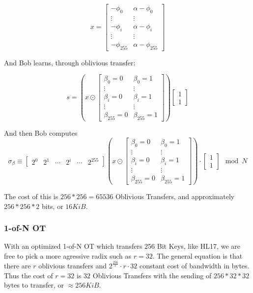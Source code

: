 \documentclass{article}
\begin{document}
$$x =\begin{bmatrix}
-\phi_0 & \alpha - \phi_0 \\
\vdots & \vdots \\
-\phi_i & \alpha - \phi_i \\
\vdots & \vdots \\
-\phi_{255} & \alpha - \phi_{255}
\end{bmatrix}$$

And Bob learns, through oblivious transfer:

$$s = 
\left(x \odot \begin{bmatrix}
\beta_0 = 0 & \beta_0 = 1 \\
\vdots & \vdots \\
\beta_i = 0 & \beta_i = 1 \\
\vdots & \vdots \\
\beta_{255} = 0 & \beta_{255} = 1
\end{bmatrix}\right)
\begin{bmatrix}
1 \\ 1
\end{bmatrix}
$$

And then Bob computes
$$\sigma_{\beta} \equiv 
\begin{bmatrix}
2^0 & 2^1 &\cdots& 2^i & \cdots& 2^{255}
\end{bmatrix}
\left(x \odot \begin{bmatrix}
\beta_0 = 0 & \beta_0 = 1 \\
\vdots & \vdots \\
\beta_i = 0 & \beta_i = 1 \\
\vdots & \vdots \\
\beta_{255} = 0 & \beta_{255} = 1
\end{bmatrix}\right) \cdot \begin{bmatrix}
1\\ 1
\end{bmatrix} \mod N$$



The cost of this is $256*256 = 65536$ Oblivious Transfers, and approximately $256*256*2$ bits, or $16 KiB$.

\subsubsection{1-of-N OT}

With an optimized 1-of-N OT which transfers 256 Bit Keys, like HL17, we are free to pick a more agressive radix such as $r=32$. The general equation is that there are $r$ oblivious transfers and $2^{\frac{256}{r}}\cdot r \cdot 32$ constant cost of bandwidth in bytes. Thus the cost of $r=32$ is $32$ Oblivious Transfers with the sending of $256*32*32$ bytes to transfer, or $\approx 256 KiB$. 
\end{document}

